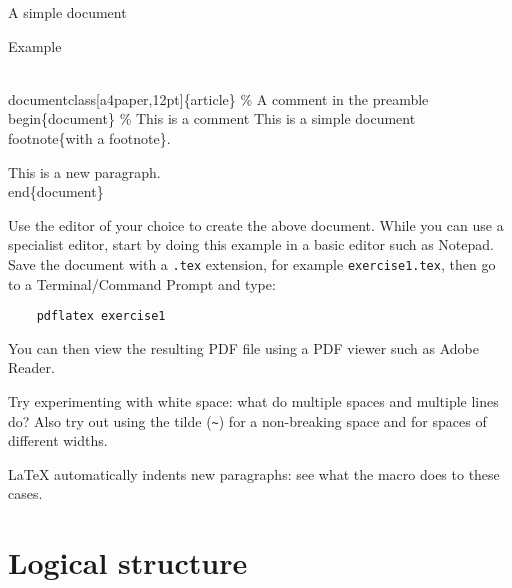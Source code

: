 \begin{frame}[fragile]{A simple document}
  \begin{block}{Example}
    \begin{semiverbatim}
\alert<2>{\\documentclass}\alert<2,4>{[a4paper,12pt]}\alert<2-3>{\{article\}}
\alert<5>{\% A comment in the preamble}
\alert<6>{\\begin\{document\}}
\alert<7>{\% This is a comment}
\alert<8>{This is   a simple}
\alert<8>{document\\footnote\{with a footnote\}.}

\alert<8>{This is a new paragraph.}
\alert<6>{\\end\{document\}}
    \end{semiverbatim}
  \end{block}
  
\end{frame}


\begin{exercise}
  Use the editor of your choice to create the above document. While you
  can use a specialist editor, start by doing this example in a basic
  editor such as Notepad. Save the document with a \texttt{.tex}
  extension, for example \texttt{exercise1.tex}, then go to a
  Terminal/Command Prompt and type:
  \begin{verbatim}
    pdflatex exercise1
  \end{verbatim}
  You can then view the resulting PDF file using a PDF viewer such as
  Adobe Reader.
  
  Try experimenting with white space: what do multiple spaces and 
  multiple lines do? Also try out using the tilde (\verb"~") for 
  a non-breaking space and \cs{,} for spaces of different
  widths.
  
  \LaTeX{} automatically indents new paragraphs: see what the 
  macro does to these cases.
\end{exercise}


\section{Logical structure}


